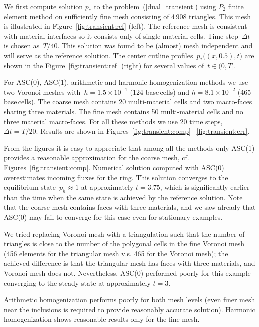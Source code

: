 We first compute solution $p_*$ to the problem~(\ref{dual_transient}) using $P_2$ finite element method on sufficiently fine mesh consisting of 4\,908 triangles. This mesh is illustrated in Figure~\ref{fig:transient:ref} (left). The reference mesh is consistent with material interfaces so it consists only of single-material cells. Time step~$\Delta t$ is chosen as~$T / 40$. This solution was found to be (almost) mesh independent and will serve as the  reference solution. The center cutline profiles~$p_*\big((x,0.5), t\big)$   are shown in the Figure~\ref{fig:transient:ref} (right) for several values of~$t \in (0, T]$.
	
For ASC(0), ASC(1), arithmetic and harmonic homogenization methods we use two Voronoi meshes with~$h = 1.5 \times 10^{-1}$ (124 base\,cells) and $h = 8.1 \times 10^{-2}$ (465 base\,cells).
The coarse mesh contains 20 multi-material cells and two macro-faces sharing three materials. The fine mesh contains 50 multi-material cells and no three material macro-faces. For all these methods we use 20 time steps, $\Delta t = T / 20$. Results are shown in Figures~\ref{fig:transient:comp}\,--\,\ref{fig:transient:err}.

From the figures it is easy to appreciate  that among all the methods only  ASC(1)  provides a reasonable approximation for the coarse mesh, cf. Figures~\ref{fig:transient:comp}.
Numerical solution computed with ASC(0) overestimates incoming fluxes for the ring. This solution converges to the equilibrium state~$p_h \approx 1$ at approximately $t = 3.75$, which is significantly earlier than the time when the same state is achieved by the reference solution. Note that the coarse mesh contains faces with three materials, and we saw already that ASC(0) may fail to converge for this case even for stationary examples.

We tried replacing Voronoi mesh with a triangulation such that the number of triangles is close to the number of the polygonal cells in the fine Voronoi mesh (456 elements for the triangular mesh v.s. 465 for the Voronoi mesh); the achieved difference is that the triangular mesh has faces with three materials, and Voronoi mesh does not. Nevertheless, ASC(0) performed poorly for this example converging to the steady-state at approximately $t = 3$.

Arithmetic homogenization performs poorly for both mesh levels (even finer mesh near the inclusions is required to provide reasonably accurate solution). Harmonic homogenization shows reasonable results only for the fine mesh.

